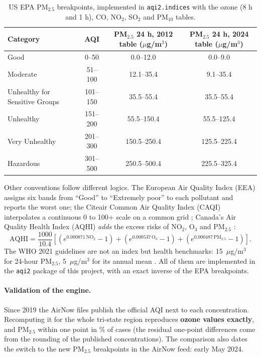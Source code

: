\documentclass[11pt]{article}
\begin{document}
\begin{table}[H]
\centering\small
\begin{tabular}{lccc}
\toprule
Category & AQI & PM$_{2.5}$ 24 h, 2012 table ($\mu$g/m$^3$) & PM$_{2.5}$ 24 h, 2024 table ($\mu$g/m$^3$)\\
\midrule
Good & 0--50 & 0.0--12.0 & 0.0--9.0\\
Moderate & 51--100 & 12.1--35.4 & 9.1--35.4\\
Unhealthy for Sensitive Groups & 101--150 & 35.5--55.4 & 35.5--55.4\\
Unhealthy & 151--200 & 55.5--150.4 & 55.5--125.4\\
Very Unhealthy & 201--300 & 150.5--250.4 & 125.5--225.4\\
Hazardous & 301--500 & 250.5--500.4 & 225.5--325.4\\
\bottomrule
\end{tabular}
\caption{US EPA PM$_{2.5}$ breakpoints, implemented in \texttt{aqi2.indices} with the ozone (8 h and 1 h), CO, NO$_2$, SO$_2$ and PM$_{10}$ tables.}
\label{tab:bp}
\end{table}

Other conventions follow different logics. The European Air Quality Index (EEA) assigns six bands from ``Good'' to ``Extremely poor'' to each pollutant and reports the worst one; the Citeair Common Air Quality Index (CAQI) interpolates a continuous 0 to 100+ scale on a common grid \citep{elshout2014}; Canada's Air Quality Health Index (AQHI) \emph{adds} the excess risks of NO$_2$, O$_3$ and PM$_{2.5}$ \citep{stieb2008}:
\begin{equation}
\text{AQHI} = \frac{1000}{10.4}\left[\left(e^{0.000871\,\text{NO}_2}-1\right)+\left(e^{0.000537\,\text{O}_3}-1\right)+\left(e^{0.000487\,\text{PM}_{2.5}}-1\right)\right].
\end{equation}
The WHO 2021 guidelines are not an index but health benchmarks: 15~$\mu$g/m$^3$ for 24-hour PM$_{2.5}$, 5~$\mu$g/m$^3$ for its annual mean \citep{who2021}. All of them are implemented in the \texttt{aqi2} package of this project, with an exact inverse of the EPA breakpoints.

\paragraph{Validation of the engine.} Since 2019 the AirNow files publish the official AQI next to each concentration. Recomputing it for the whole tri-state region reproduces \textbf{\ValOzN{} ozone values exactly}, and PM$_{2.5}$ within one point in \ValPMwithin{}\% of cases (the residual one-point differences come from the rounding of the published concentrations). The comparison also dates the switch to the new PM$_{2.5}$ breakpoints in the AirNow feed: early May 2024.
\end{document}
